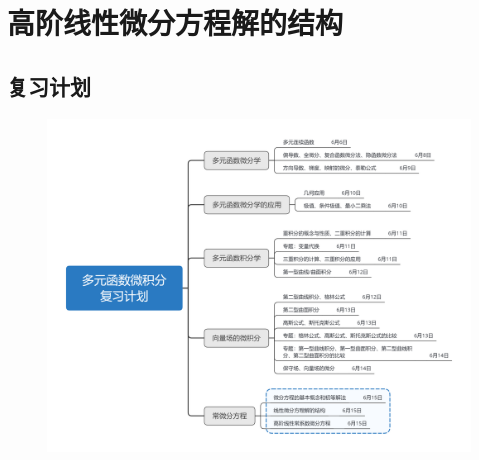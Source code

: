 \documentclass[12pt,UTF8,fleqn]{ctexart}
\begin{document}
\setcounter{section}{16}
\section{高阶线性微分方程解的结构}
\subsection{复习计划}
\begin{figure}[H]
\begin{center}
\includegraphics[height=0.5\textheight]{Figures20190615/plan.png}
\end{center}
\end{figure}
\end{document}
